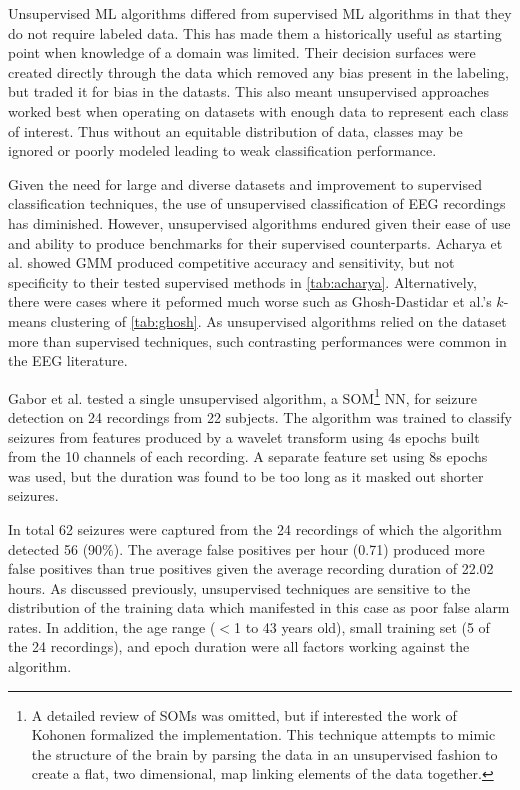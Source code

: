 Unsupervised \ac{ML} algorithms differed from supervised \ac{ML} algorithms in that they do not require labeled data. This has made them a historically useful as starting point when knowledge of a domain was limited. Their decision surfaces were created directly through the data which removed any bias present in the labeling, but traded it for bias in the datasts. This also meant unsupervised approaches worked best when operating on datasets with enough data to represent each class of interest. Thus without an equitable distribution of data, classes may be ignored or poorly modeled leading to weak classification performance.

Given the need for large and diverse datasets and improvement to supervised classification techniques, the use of unsupervised classification of \ac{EEG} recordings has diminished. However, unsupervised algorithms endured given their ease of use and ability to produce benchmarks for their supervised counterparts. Acharya et al.\cite{Acharya2012} showed \ac{GMM} produced competitive accuracy and sensitivity, but not specificity to their tested supervised methods in \cref{tab:acharya}. Alternatively, there were cases where it peformed much worse such as Ghosh-Dastidar et al.'s \cite{Ghosh-Dastidar2007} $k$-means clustering of \cref{tab:ghosh}. As unsupervised algorithms relied on the dataset more than supervised techniques, such contrasting performances were common in the \ac{EEG} literature.

Gabor et al.\cite{Gabor1996} tested a single unsupervised algorithm, a \ac{SOM}\footnote{A detailed review of \acp{SOM} was omitted, but if interested the work of Kohonen\cite{Kohonen1990} formalized the implementation. This technique attempts to mimic the structure of the brain by parsing the data in an unsupervised fashion to create a flat, two dimensional, map linking elements of the data together.} \ac{NN}, for seizure detection on 24 recordings from 22 subjects. The algorithm was trained to classify seizures from features produced by a wavelet transform using 4s epochs built from the 10 channels of each recording. A separate feature set using 8s epochs was used, but the duration was found to be too long as it masked out shorter seizures.

In total 62 seizures were captured from the 24 recordings of which the algorithm detected 56 (90\%). The average false positives per hour (0.71) produced more false positives than true positives given the average recording duration of 22.02 hours. As discussed previously, unsupervised techniques are sensitive to the distribution of the training data which manifested in this case as poor false alarm rates. In addition, the age range ($<$1 to 43 years old), small training set (5 of the 24 recordings), and epoch duration were all factors working against the algorithm.

